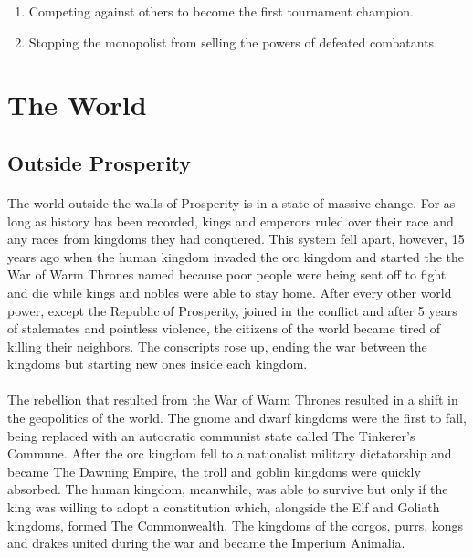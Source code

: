 \begin{enumerate}
    \item Competing against others to become the first tournament champion.
    \item Stopping the monopolist from selling the powers of defeated combatants.
\end{enumerate}

\pagebreak

\section{The World}

\subsection{Outside Prosperity}

\paragraph{} The world outside the walls of Prosperity is in a state of massive change. For as long as history has been recorded, kings and emperors ruled over their race and any races from kingdoms they had conquered. This system fell apart, however, 15 years ago when the human kingdom invaded the orc kingdom and started the the War of Warm Thrones named because poor people were being sent off to fight and die while kings and nobles were able to stay home. After every other world power, except the Republic of Prosperity, joined in the conflict and after 5 years of stalemates and pointless violence, the citizens of the world became tired of killing their neighbors. The conscripts rose up, ending the war between the kingdoms but starting new ones inside each kingdom.

\paragraph{} The rebellion that resulted from the War of Warm Thrones resulted in a shift in the geopolitics of the world. The gnome and dwarf kingdoms were the first to fall, being replaced with an autocratic communist state called The Tinkerer's Commune. After the orc kingdom fell to a nationalist military dictatorship and became The Dawning Empire, the troll and goblin kingdoms were quickly absorbed. The human kingdom, meanwhile, was able to survive but only if the king was willing to adopt a constitution which, alongside the Elf and Goliath kingdoms, formed The Commonwealth. The kingdoms of the corgos, purrs, kongs and drakes united during the war and became the Imperium Animalia.

